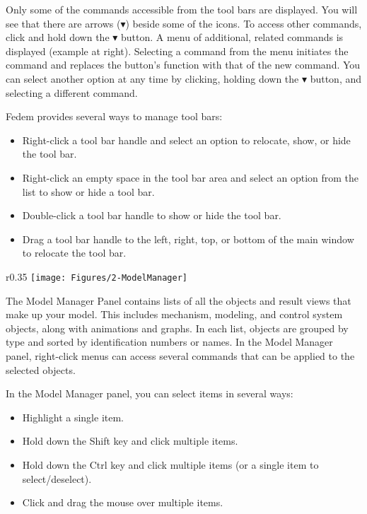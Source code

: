 Only some of the commands accessible from the tool bars are displayed. You will
see that there are arrows ($\blacktriangledown$) beside some of the icons.
To access other commands, click and hold down the $\blacktriangledown$ button.
A menu of additional, related commands is displayed (example at right).
Selecting a command from the menu initiates the command and replaces the
button’s function with that of the new command. You can select another
option at any time by clicking, holding down the $\blacktriangledown$ button,
and selecting a different command.

\clearpage
Fedem provides several ways to manage tool bars:

\begin{itemize}
\item Right-click a tool bar handle and select an option
  to relocate, show, or hide the tool bar.
\item Right-click an empty space in the tool bar area and select
  an option from the list to show or hide a tool bar.
\item Double-click a tool bar handle to show or hide the tool bar.
\item Drag a tool bar handle to the left, right, top, or bottom of
  the main window to relocate the tool bar.
\end{itemize}



\begin{wrapfigure}{r}{0.35\textwidth}
  \texttt{[image: Figures/2-ModelManager]}
\end{wrapfigure}

The Model Manager Panel contains lists of all the objects and result views
that make up your model. This includes mechanism, modeling, and control
system objects, along with animations and graphs. In each list,
objects are grouped by type and sorted by identification numbers or names.
In the Model Manager panel, right-click menus can access several
commands that can be applied to the selected objects.



In the Model Manager panel, you can select items in several ways:
\begin{itemize}
\item Highlight a single item.
\item Hold down the Shift key and click multiple items.
\item Hold down the Ctrl key and click multiple items
  (or a single item to select/deselect).
\item Click and drag the mouse over multiple items.
\end{itemize}


